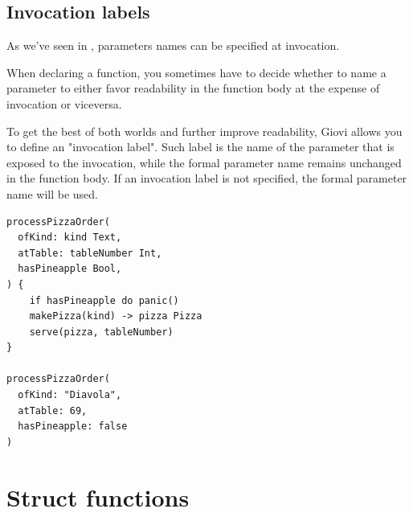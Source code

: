 \subsection{Invocation labels}

As we've seen in , parameters names can be specified at
invocation.

When declaring a function, you sometimes have to decide whether to name a
parameter to either favor readability in the function body at the expense of
invocation or viceversa.

%
%
%
%

To get the best of both worlds and further improve readability, Giovi allows
you to define an "invocation label". Such label is the name of the parameter
that is exposed to the invocation, while the formal parameter name remains
unchanged in the function body. If an invocation label is not specified, the
formal parameter name will be used.

\begin{verbatim}
processPizzaOrder(
  ofKind: kind Text,
  atTable: tableNumber Int,
  hasPineapple Bool,
) {
	if hasPineapple do panic()
	makePizza(kind) -> pizza Pizza
	serve(pizza, tableNumber)
}

processPizzaOrder(
  ofKind: "Diavola",
  atTable: 69,
  hasPineapple: false
)
\end{verbatim}

\clearpage

\section{Struct functions}
\label{sec:struct_functions}

